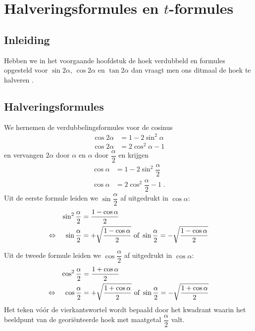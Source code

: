 \documentclass[twoside,a4paper,12pt]{article}
\begin{document}
\cleardoublepage
\section{Halveringsformules en $t$-formules}

\vspace*{-0.5cm}
\subsection{Inleiding}
Hebben we in het voorgaande hoofdstuk de hoek verdubbeld en formules opgesteld
voor $\sin 2\alpha$, $\cos 2\alpha$ en $\tan 2\alpha$ dan vraagt men ons ditmaal de hoek te halveren .

\vspace*{-0.5cm}
\subsection{Halveringsformules}

We hernemen de verdubbelingsformules voor de cosinus
\begin{align*}
  \cos 2\alpha &= 1 - 2\sin^2\alpha\\
  \cos 2\alpha &= 2\cos^2\alpha - 1
\end{align*}
en vervangen $2\alpha$ door $\alpha$ en $\alpha$ door $\dfrac{\alpha}{2}$ en krijgen
\begin{align*}
  \cos \alpha &= 1 - 2\sin^2\dfrac{\alpha}{2}\\
  \cos \alpha &= 2\cos^2\dfrac{\alpha}{2} - 1\;.
\end{align*}
Uit de eerste formule leiden we $\sin\dfrac{\alpha}{2}$ af uitgedrukt in $\cos\alpha$:
\begin{align*}
          && \sin^2\dfrac{\alpha}{2} &= \dfrac{1-\cos\alpha}{2}\\
     \Leftrightarrow &&   \sin\dfrac{\alpha}{2} &= +\sqrt{\dfrac{1-\cos\alpha}{2}} \mbox{ of } \sin\dfrac{\alpha}{2}= -\sqrt{\dfrac{1-\cos\alpha}{2}}
\end{align*}

Uit de tweede formule leiden we $\cos\dfrac{\alpha}{2}$ af uitgedrukt in $\cos\alpha$:
\begin{align*}
          && \cos^2\dfrac{\alpha}{2} &= \dfrac{1+\cos\alpha}{2}\\
     \Leftrightarrow &&   \cos\dfrac{\alpha}{2} &= +\sqrt{\dfrac{1+\cos\alpha}{2}} \mbox{ of } \sin\dfrac{\alpha}{2}= -\sqrt{\dfrac{1+\cos\alpha}{2}}
\end{align*}
Het teken vóór de vierkantswortel wordt bepaald door het kwadrant waarin het
beeldpunt van de georiënteerde hoek met maatgetal $\dfrac{\alpha}{2}$ valt.
\end{document}
